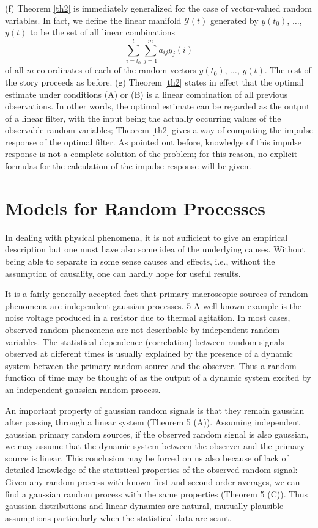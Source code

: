 \documentclass{article}
\newcommand{\manf}[1]{\mathbf{\mathcal{#1}}}
\begin{document}
(f) Theorem \ref{th2} is immediately generalized for the case of vector-valued random variables. In fact, we define the linear manifold $\manf{Y}(t)$ generated by $y(t_0)$, $\dotsc$, $y(t)$ to be the set of all linear combinations
\begin{equation*}
\sum^t_{i=t_0}\sum^m_{j=1}a_{ij}y_j (i)
\end{equation*}
of all $m$ co-ordinates of each of the random vectors $y(t_0)$, $\dotsc$, $y(t)$. The rest of the story proceeds as before.
(g) Theorem \ref{th2} states in effect that the optimal estimate under conditions (A) or (B) is a linear combination of all previous observations. In other words, the optimal estimate can be regarded as the output of a linear filter, with the input being the actually occurring values of the observable random variables; Theorem \ref{th2} gives a way of computing the impulse response of the optimal filter. As pointed out before, knowledge of this impulse response is not a complete solution of the problem; for this reason, no explicit formulas for the calculation of the impulse response will be given.
\section{Models for Random Processes}
In dealing with physical phenomena, it is not sufficient to give
an empirical description but one must have also some idea of the
underlying causes. Without being able to separate in some sense
causes and effects, i.e., without the assumption of causality, one
can hardly hope for useful results.

It is a fairly generally accepted fact that primary macroscopic
sources of random phenomena are independent gaussian processes.
5 A well-known example is the noise voltage produced in a
resistor due to thermal agitation. In most cases, observed random
phenomena are not describable by independent random variables.
The statistical dependence (correlation) between random signals
observed at different times is usually explained by the presence of
a dynamic system between the primary random source and the
observer. Thus a random function of time may be thought of as the
output of a dynamic system excited by an independent gaussian
random process.

An important property of gaussian random signals is that they
remain gaussian after passing through a linear system (Theorem 5
(A)). Assuming independent gaussian primary random sources, if
the observed random signal is also gaussian, we may assume that
the dynamic system between the observer and the primary source
is linear. This conclusion may be forced on us also because of
lack of detailed knowledge of the statistical properties of the
observed random signal: Given any random process with known
first and second-order averages, we can find a gaussian random
process with the same properties (Theorem 5 (C)). Thus gaussian
distributions and linear dynamics are natural, mutually plausible
assumptions particularly when the statistical data are scant.
\end{document}
